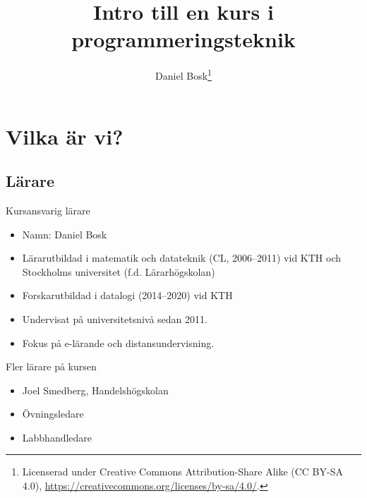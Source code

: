 \title{%
  Intro till en kurs i programmeringsteknik
}
\author{Daniel Bosk\thanks{%
    Licenserad under Creative Commons Attribution-Share Alike (CC BY-SA 4.0), 
    \url{https://creativecommons.org/licenses/by-sa/4.0/}.
}}


\mode*

\begin{abstract}
  
\end{abstract}


\section{Vilka är vi?}

\subsection{Lärare}

\begin{frame}
  \begin{block}{Kursansvarig lärare}
    \begin{itemize}
      \item Namn: Daniel Bosk
      \item Lärarutbildad i matematik och datateknik (CL, 2006--2011) vid KTH 
        och Stockholms universitet (f.d. Lärarhögskolan)
      \item Forskarutbildad i datalogi (2014--2020) vid KTH
      \item Undervisat på universitetsnivå sedan 2011.
      \item Fokus på e-lärande och distansundervisning.
    \end{itemize}
  \end{block}
\end{frame}

\begin{frame}
  \begin{block}{Fler lärare på kursen}
    \begin{itemize}
      \item Joel Smedberg, Handelshögskolan
      \item Övningsledare
      \item Labbhandledare
    \end{itemize}
  \end{block}
\end{frame}

